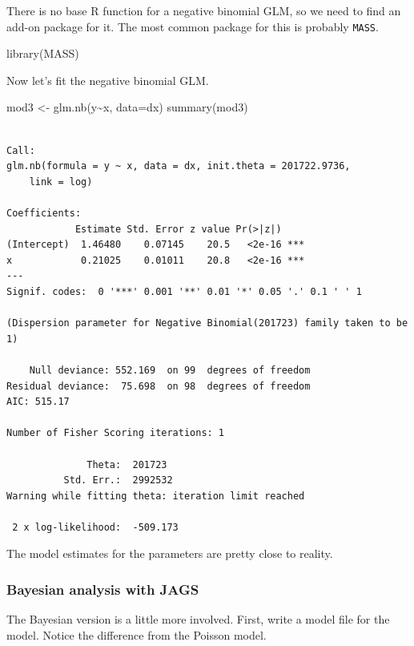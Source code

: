 \documentclass[
  13,
  letterpaper,
]{report}
\newenvironment{Shaded}{\begin{snugshade}}{\end{snugshade}}
\newcommand{\AttributeTok}[1]{\textcolor[rgb]{0.40,0.45,0.13}{#1}}
\newcommand{\FunctionTok}[1]{\textcolor[rgb]{0.28,0.35,0.67}{#1}}
\newcommand{\NormalTok}[1]{\textcolor[rgb]{0.00,0.23,0.31}{#1}}
\newcommand{\OtherTok}[1]{\textcolor[rgb]{0.00,0.23,0.31}{#1}}
\newcommand{\SpecialCharTok}[1]{\textcolor[rgb]{0.37,0.37,0.37}{#1}}
\begin{document}
There is no base R function for a negative binomial GLM, so we need to
find an add-on package for it. The most common package for this is
probably \texttt{MASS}.

\begin{Shaded}
\begin{Highlighting}[]
\FunctionTok{library}\NormalTok{(MASS)}
\end{Highlighting}
\end{Shaded}

Now let's fit the negative binomial GLM.

\begin{Shaded}
\begin{Highlighting}[]
\NormalTok{mod3 }\OtherTok{\textless{}{-}} \FunctionTok{glm.nb}\NormalTok{(y}\SpecialCharTok{\textasciitilde{}}\NormalTok{x, }\AttributeTok{data=}\NormalTok{dx)}
\FunctionTok{summary}\NormalTok{(mod3)}
\end{Highlighting}
\end{Shaded}

\begin{verbatim}

Call:
glm.nb(formula = y ~ x, data = dx, init.theta = 201722.9736, 
    link = log)

Coefficients:
            Estimate Std. Error z value Pr(>|z|)    
(Intercept)  1.46480    0.07145    20.5   <2e-16 ***
x            0.21025    0.01011    20.8   <2e-16 ***
---
Signif. codes:  0 '***' 0.001 '**' 0.01 '*' 0.05 '.' 0.1 ' ' 1

(Dispersion parameter for Negative Binomial(201723) family taken to be 1)

    Null deviance: 552.169  on 99  degrees of freedom
Residual deviance:  75.698  on 98  degrees of freedom
AIC: 515.17

Number of Fisher Scoring iterations: 1

              Theta:  201723 
          Std. Err.:  2992532 
Warning while fitting theta: iteration limit reached 

 2 x log-likelihood:  -509.173 
\end{verbatim}

The model estimates for the parameters are pretty close to reality.

\subsubsection{Bayesian analysis with JAGS}\label{sec-glm1-nb-ex-jags}

The Bayesian version is a little more involved. First, write a model
file for the model. Notice the difference from the Poisson model.
\end{document}
